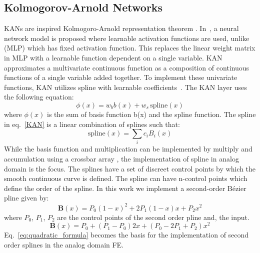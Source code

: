 \subsection{Kolmogorov-Arnold Networks}
KANs are inspired  Kolmogoro-Arnold representation theorem \cite{theorem}. In~\cite{Liu:KAN2024}, a neural network model is proposed where learnable activation functions are used, unlike  (MLP) which has  fixed activation function. This replaces the linear weight matrix in MLP with a learnable function dependent on a single variable.
KAN approximates a multivariate continuous function as a composition of continuous functions of a single variable added together. 
To implement these univariate functions, KAN utilizes  spline with learnable coefficients~\cite{Liu:KAN2024}. The KAN layer uses the following equation: 
\begin{equation}
\phi(x) = w_b b(x) + w_s \, \text{spline}(x)
\label{KAN}
\end{equation}
where $\phi(x)$ is the sum of basis function b(x) and the spline function. The spline in eq.~\ref{KAN} is a linear combination of  splines such that: 
\begin{equation}
\text{spline}(x) = \sum_{i} c_i B_i(x)
\label{eq:spline_sum}
\end{equation}
While the basis function and multiplication can be implemented by multiply and accumulation using a crossbar array \cite{crossbar}, the implementation of spline in analog domain is the focus. The  splines have a set of discreet  control points by which the smooth continuous curve is defined. The spline can have n-control points which define the order of the spline. In this work we implement a second-order Bézier pline \cite{secondorderspline} given by: 
\begin{equation}
\mathbf{B}(x) = P_0(1 - x)^2 + 2P_1(1 - x)x + P_2x^2 
\label{eq:bezier_second_order}
\end{equation}
where $P_{0}$, $P_{1}$, $P_{2}$ are the control points of the second order pline and,  the input. 
\begin{equation}
\mathbf{B}(x) = P_0 + (P_1 - P_0)2x + (P_0 - 2P_1 + P_2)x^2
\label{eq:quadratic_formula}
\end{equation}
Eq.~\ref{eq:quadratic_formula} becomes the basis for the implementation of second order  splines in the analog domain  FE.

